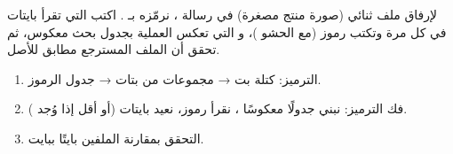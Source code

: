 \begin{statement}
لإرفاق ملف ثنائي (صورة منتج مصغرة) في رسالة ، نرمّزه بـ \textbf{}. اكتب  التي تقرأ  بايتات في كل مرة وتكتب  رموز (مع الحشو \code{=})، و  التي تعكس العملية بجدول بحث معكوس، ثم تحقق أن الملف المسترجع مطابق للأصل.
\end{statement}
\begin{stepsbox}\begin{enumerate}
\item الترميز: كتلة  بت →  مجموعات من  بتات → جدول الرموز.
\item فك الترميز: نبني جدولًا معكوسًا ، نقرأ  رموز، نعيد  بايتات (أو أقل إذا وُجد \code{=}).
\item التحقق بمقارنة الملفين بايتًا ببايت.
\end{enumerate}\end{stepsbox}
